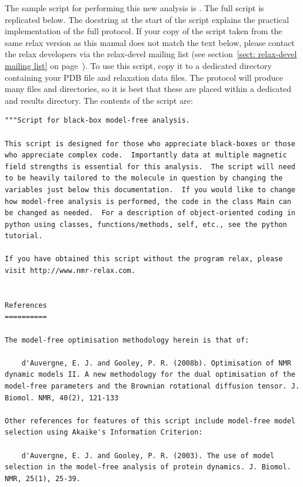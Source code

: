 \begin{htmlonly}
\begin{htmlonly}
The sample script for performing this new analysis is .  The full script is replicated below.  The docstring at the start of the script explains the practical implementation of the full protocol.  If your copy of the  script taken from the same relax version as this manual does not match the text below, please contact the relax developers via the relax-devel mailing list (see section~\ref{sect: relax-devel mailing list} on page~\pageref{sect: relax-devel mailing list}).  To use this script, copy it to a dedicated directory containing your PDB file and relaxation data files.  The protocol will produce many files and directories, so it is best that these are placed within a dedicated and results directory.  The contents of the script are:

\begin{lstlisting}
"""Script for black-box model-free analysis.

This script is designed for those who appreciate black-boxes or those who appreciate complex code.  Importantly data at multiple magnetic field strengths is essential for this analysis.  The script will need to be heavily tailored to the molecule in question by changing the variables just below this documentation.  If you would like to change how model-free analysis is performed, the code in the class Main can be changed as needed.  For a description of object-oriented coding in python using classes, functions/methods, self, etc., see the python tutorial.

If you have obtained this script without the program relax, please visit http://www.nmr-relax.com.


References
==========

The model-free optimisation methodology herein is that of:

    d'Auvergne, E. J. and Gooley, P. R. (2008b). Optimisation of NMR dynamic models II. A new methodology for the dual optimisation of the model-free parameters and the Brownian rotational diffusion tensor. J. Biomol. NMR, 40(2), 121-133

Other references for features of this script include model-free model selection using Akaike's Information Criterion:

    d'Auvergne, E. J. and Gooley, P. R. (2003). The use of model selection in the model-free analysis of protein dynamics. J. Biomol. NMR, 25(1), 25-39.


\end{lstlisting}
\end{htmlonly}
\end{htmlonly}
